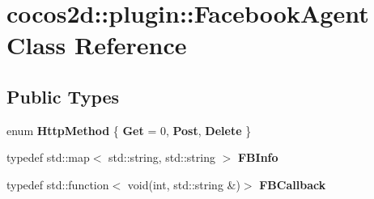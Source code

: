 \hypertarget{classcocos2d_1_1plugin_1_1FacebookAgent}{}\section{cocos2d\+:\+:plugin\+:\+:Facebook\+Agent Class Reference}
\label{classcocos2d_1_1plugin_1_1FacebookAgent}
\subsection*{Public Types}
\begin{DoxyCompactItemize}
\item 
\mbox{\label{classcocos2d_1_1plugin_1_1FacebookAgent_ac684f7a9023d5b26ef6cb248560dbec8}} 
enum {\bfseries Http\+Method} \{ {\bfseries Get} = 0, 
{\bfseries Post}, 
{\bfseries Delete}
 \}
\item 
\mbox{\label{classcocos2d_1_1plugin_1_1FacebookAgent_af49b149b865fdb8be2b1b39749178cbe}} 
typedef std\+::map$<$ std\+::string, std\+::string $>$ {\bfseries F\+B\+Info}
\item 
\mbox{\label{classcocos2d_1_1plugin_1_1FacebookAgent_acf52bde7b014dec256858f74d303dbe7}} 
typedef std\+::function$<$ void(int, std\+::string \&)$>$ {\bfseries F\+B\+Callback}
\end{DoxyCompactItemize}
